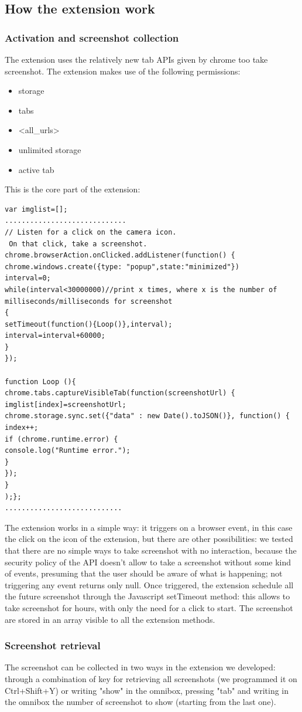 \documentclass[12pt]{article}
\begin{document}
\begin{multicols}{2}
\subsection{How the extension work}
\subsubsection*{Activation and screenshot collection}
The extension uses the relatively new tab APIs given by chrome too take screenshot.
The extension makes use of the following permissions:\begin{itemize}
	\item storage
	\item tabs
	\item <all\_urls>
	\item unlimited storage
	\item active tab
	\end{itemize}
	This is the core part of the extension:
	\begin{lstlisting}
var imglist=[];
.............................
// Listen for a click on the camera icon.
 On that click, take a screenshot.
chrome.browserAction.onClicked.addListener(function() {
chrome.windows.create({type: "popup",state:"minimized"})
interval=0;
while(interval<30000000)//print x times, where x is the number of milliseconds/milliseconds for screenshot
{
setTimeout(function(){Loop()},interval);    
interval=interval+60000;
}
});

function Loop (){
chrome.tabs.captureVisibleTab(function(screenshotUrl) {
imglist[index]=screenshotUrl;
chrome.storage.sync.set({"data" : new Date().toJSON()}, function() {
index++;
if (chrome.runtime.error) {
console.log("Runtime error.");
}
});      
}
);};
............................
	\end{lstlisting}
	 The extension works in a simple way: it triggers on a browser event, in this case the click on the icon of the extension, but there are other possibilities: we tested that there are no simple ways to take screenshot with no interaction, because the security policy of the API doesn't allow to take a screenshot without some kind of events, presuming that the user should be aware of what is happening; not triggering any event returns only null.
Once triggered, the extension schedule all the future screenshot through the Javascript setTimeout method: this allows to take screenshot for hours, with only the need for a click to start.
The screenshot are stored in an array visible to all the extension methods.
\subsubsection*{Screenshot retrieval}
The screenshot can be collected in two ways in the extension we developed:
through a combination of key for retrieving all screenshots (we programmed it on Ctrl+Shift+Y) or writing "show" in the omnibox, pressing "tab" and writing in the omnibox the number of screenshot to show (starting from the last one).

\end{multicols}
\end{document}
